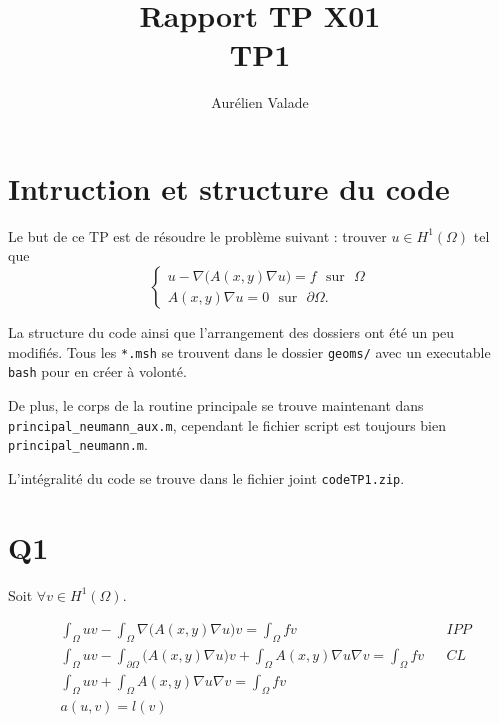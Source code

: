 \documentclass[11pt]{article}
\title{Rapport TP X01 \\ TP1}
\author{Aurélien Valade}
\date{}
\newcommand{\ms}{~~~}
\begin{document}
\maketitle

\section{Intruction et structure du code}


Le but de ce TP est de résoudre le problème suivant : trouver $u \in H^1(\Omega)$ tel que  
\begin{equation}
  \begin{cases}
    u - \nabla \big(A(x,y) \nabla u\big) = f \ms \mbox{sur}\ms \Omega\\
    A(x,y) \nabla u = 0 \ms \mbox{sur}\ms \partial\Omega.
  \end{cases}
\end{equation}

La structure du code ainsi que l'arrangement des dossiers ont été un peu modifiés. Tous les \texttt{*.msh} se trouvent dans le dossier \texttt{geoms/} avec un executable \texttt{bash} pour en créer à volonté.

De plus, le corps de la routine principale se trouve maintenant dans \texttt{principal\_neumann\_aux.m}, cependant le fichier script est toujours bien \texttt{principal\_neumann.m}. 

L'intégralité du code se trouve dans le fichier joint \texttt{codeTP1.zip}. 
\section{Q1}

Soit $\forall v\in H^1(\Omega)$.

\begin{align}
  \label{eq:var}
  &\int_{\Omega} uv - \int_{\Omega} \nabla \big(A(x,y) \nabla u\big) v = \int_{\Omega} f v && IPP \\
  &\int_{\Omega} uv - \int_{\partial \Omega} \big(A(x,y) \nabla u\big) v + \int_{ \Omega} A(x,y) \nabla u \nabla v  = \int_{\Omega} f v  && CL\\
  &\int_{\Omega} uv + \int_{ \Omega} A(x,y) \nabla u \nabla v  = \int_{\Omega} f v \\
  &a(u,v) = l(v)
\end{align}
\end{document}
